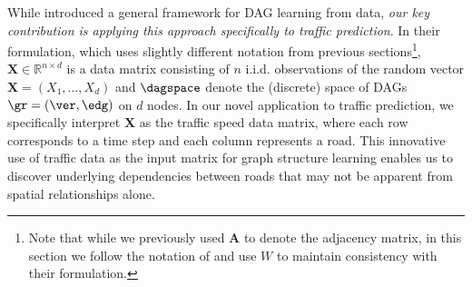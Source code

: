 \documentclass[pdflatex,sn-mathphys-num]{sn-jnl}%
\theoremstyle{thmstyleone}%
\theoremstyle{thmstyletwo}%
\theoremstyle{thmstylethree}%
\begin{document}
While \cite{zheng2018dags} introduced a general framework for DAG learning from data, \textit{our key contribution is applying this approach specifically to traffic prediction}. In their formulation, which uses slightly different notation from previous sections\footnote{Note that while we previously used $\mathbf{A}$ to denote the adjacency matrix, in this section we follow the notation of \cite{zheng2018dags} and use $W$ to maintain consistency with their formulation.},  $\mathbf{X}\in\mathbb{R}^{n\times d}$ is a data matrix consisting of $n$ i.i.d. observations of the random vector $\mathbf{X}=(X_{1},\ldots,X_{d})$ and  $\dagspace$ denote the (discrete) space of DAGs $\gr=(\ver,\edg)$ on $d$ nodes. In our novel application to traffic prediction, we specifically interpret $\mathbf{X}$ as the traffic speed data matrix, where each row corresponds to a time step and each column represents a road. This innovative use of traffic data as the input matrix for graph structure learning enables us to discover underlying dependencies between roads that may not be apparent from spatial relationships alone.
\end{document}
